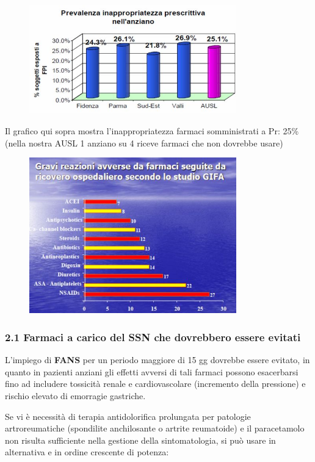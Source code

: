\begin{figure}[!ht]
\centering
	\includegraphics[width=0.8\textwidth]{37/image2.jpg}
	\end{figure}

  Il grafico qui sopra mostra l'inappropriatezza farmaci somministrati a
  Pr: 25\% (nella nostra AUSL 1 anziano su 4 riceve farmaci che non
  dovrebbe usare)

\begin{figure}[!ht]
\centering
	\includegraphics[width=0.8\textwidth]{37/image3.jpg}
	\end{figure}

  \subsubsection{2.1 Farmaci a carico del SSN che dovrebbero essere evitati}

  L'impiego di \textbf{FANS} per un periodo maggiore di 15 gg dovrebbe
  essere evitato, in quanto in pazienti anziani gli effetti avversi di
  tali farmaci possono esacerbarsi fino ad includere tossicità renale e
  cardiovascolare (incremento della pressione) e rischio elevato di
  emorragie gastriche.

  Se vi è necessità di terapia antidolorifica prolungata per patologie
  artroreumatiche (spondilite anchilosante o artrite reumatoide) e il
  paracetamolo non risulta sufficiente nella gestione della
  sintomatologia, si può usare in alternativa e in ordine crescente di
  potenza:

